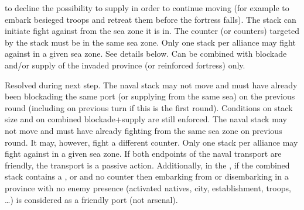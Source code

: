 to decline the possibility to supply in order to continue moving (for example
to embark besieged troops and retreat them before the fortress falls).
 The stack can initiate fight against \corsaire from
the sea zone it is in. The \corsaire counter (or counters) targeted by the
stack must be in the same sea zone. Only one stack per alliance may fight
against \corsaire in a given sea zone.
 See details below. Can be combined with blockade
and/or supply of the invaded province (or reinforced fortress) only.


\label{chMilitary:Moves:Passive Naval}
\bparag[Exploration.] Resolved during next step.
 The naval stack may not move and
must have already been blockading the same port (or supplying from the same
sea) on the previous round (including on previous turn if this is the first
round). Conditions on stack size and on combined blockade+supply are still
enforced.
 The naval stack may not move and
must have already fighting \corsaire from the same sea zone on previous
round. It may, however, fight a different \corsaire counter. Only one stack
per alliance may fight against \corsaire in a given sea zone.
 If both endpoints of the naval transport
are friendly, the transport is a passive action. Additionally, in the \ROTW,
if the combined stack contains a \LeaderE, \LeaderC or \LeaderGov and no \ARMY
counter then embarking from or disembarking in a province with no enemy
presence (activated natives, city, establishment, troops, \ldots) is
considered as a friendly port (not arsenal).

